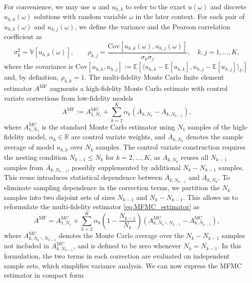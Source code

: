 For convenience, we may use $u$ and $u_{h,k}$ to refer to the exact $u(\omega)$ and discrete $u_{h,k}(\omega)$ solutions with random variable $\omega$ in the later context. For each pair of $u_{h,k}(\omega)$ and $u_{h,j}(\omega)$, we define the variance and the Pearson correlation coefficient as
%
\begin{equation*}
    \sigma_k^2 = \mathbb{V}\left[u_{h,k}(\omega)\right],\qquad \rho_{k,j} 
                       = \frac{\text{Cov}\left[ u_{h,k}(\omega), u_{h,j}(\omega)\right]}{\sigma_k\sigma_j}, \quad k,j=1,\dots, K,
\end{equation*}
%
where the covariance is $\text{Cov}[u_{h,k}, u_{h,j}] := \mathbb{E}[\langle u_{h,k} - \mathbb{E}[u_{h,k}], u_{h,j} - \mathbb{E}[u_{h,j}]\rangle_U]$ and, by definition, $\rho_{k,k}=1$. The multi-fidelity Monte Carlo finite element estimator $A^{\text{MF}}$ augments a high-fidelity Monte Carlo estimate with control variate corrections from low-fidelity models
%
\begin{equation}\label{eq:MFMC_estimator}
    A^{\text{MF}} := A^{\text{MC}}_{1,N_1} + \sum_{k=2}^K \alpha_k\left(\overline{A}_{k,N_k} - \overline{A}_{k,N_{k-1}} \right),
\end{equation}
%
where $A^{\text{MC}}_{1,N_1}$ is the standard Monte Carlo estimator using $N_1$ samples of the high-fidelity model, $\alpha_k\in \mathbb{R}$ are control variate weights, and $\overline{A}_{k,N_k}$ denotes the sample average of model $u_{h,k}$ over $N_k$ samples. The control variate construction requires the nesting condition $N_{k-1}\le N_k$ for $k=2,\ldots, K$, as $\overline{A}_{k,N_{k}}$ reuses all $N_{k-1}$ samples from $\overline{A}_{k,N_{k-1}}$, possibly supplemented by additional $N_{k} - N_{k-1}$ samples. This reuse introduces statistical dependence between $\overline{A}_{k,N_{k-1}}$ and $\overline{A}_{k,N_{k}}$. To eliminate sampling dependence in the correction terms, we partition the $N_k$ samples into two disjoint sets of sizes  $N_{k-1}$ and $N_k - N_{k-1}$. This allows us to reformulate the multi-fidelity estimator \eqref{eq:MFMC_estimator} as
%
\begin{equation}\label{eq:MFMC_estimator_independent}
    A^{\text{MF}} = A^{\text{MC}}_{1,N_1} +  \sum_{k=2}^K \alpha_k\left(1-\frac{N_{k-1}}{N_{k}}\right)\left(A_{k,N_k\backslash N_{k-1}}^{\text{MC}}-A_{k,N_{k-1}}^{\text{MC}}\right),
\end{equation}
%
where $A^{\text{MC}}_{k,N_k \backslash N_{k-1}}$ denotes the Monte Carlo average over the $N_k - N_{k-1}$ samples not included in $A^{\text{MC}}_{k,N_{k-1}}$, and is defined to be zero whenever $N_k=N_{k-1}$. In this formulation, the two terms in each correction are evaluated on independent sample sets, which simplifies variance analysis. We can now express the MFMC estimator in compact form
